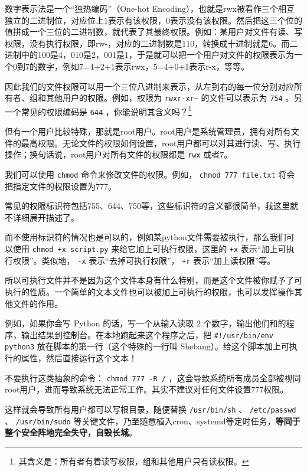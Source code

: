 数字表示法是一个“独热编码”（One-hot Encoding），也就是rwx被看作三个相互独立的二进制位，对应位上1表示有该权限，0表示没有该权限。然后把这三个位的值拼成一个三位的二进制数，就代表了其最终权限。例如：某用户对文件有读、写权限，没有执行权限，即rw-，对应的二进制数是110，转换成十进制就是6。而二进制中的100是4，010是2，001是1，于是就可以把一个用户对文件的权限表示为一个0到7的数字，例如7=4+2+1表示rwx，5=4+0+1表示r-x，等等。

因此我们的文件权限可以用一个三位八进制来表示，从左到右的每一位分别对应所有者、组和其他用户的权限。例如，权限为 \texttt{rwxr-xr--} 的文件可以表示为 \texttt{754} 。另一个常见的权限编码是 \texttt{644} ，你能说明其含义吗？\footnote{其含义是：所有者有着读写权限，组和其他用户只有读权限。}

但有一个用户比较特殊，那就是root用户。root用户是系统管理员，拥有对所有文件的最高权限。无论文件的权限如何设置，root用户都可以对其进行读、写、执行操作；换句话说，root用户对所有文件的权限都是 \texttt{rwx} 或者7。

我们可以使用 \texttt{chmod} 命令来修改文件的权限。例如， \texttt{chmod 777 file.txt} 将会把指定文件的权限设置为777。

常见的权限标识符包括755、644、750等，这些标识符的含义都很简单，我这里就不详细展开描述了。

而不使用标识符的情况也是可以的，例如某python文件需要被执行，那么我们可以使用 \texttt{chmod +x script.py} 来给它加上可执行权限，这里的 \texttt{+x} 表示“加上可执行权限”。类似地， \texttt{-x} 表示“去掉可执行权限”， \texttt{+r} 表示“加上读权限”等。

所以可执行文件并不是因为这个文件本身有什么特别，而是这个文件被你赋予了可执行的性质。一个简单的文本文件也可以被加上可执行的权限，也可以发挥操作其他文件的作用。

例如，如果你会写 Python 的话，写一个从输入读取 2 个数字，输出他们和的程序，输出结果到控制台。在本地跑起来这个程序之后，把  \texttt{\#!/usr/bin/env python3}  放在脚本的第一行（这个特殊的一行叫 Shebang）。给这个脚本加上可执行的属性，然后直接运行这个文本！

\begin{warning}
  不要执行这类抽象的命令： \texttt{chmod 777 -R /} ，这会导致系统所有成员全部被视同root用户，进而导致系统无法正常工作。其实不建议对任何文件设置777权限。
  
  这样就会导致所有用户都可以写根目录，随便替换 \texttt{/usr/bin/sh} 、 \texttt{/etc/passwd} 、 \texttt{/usr/bin/sudo} 等关键文件，乃至随意植入cron、systemd等定时任务，\textbf{等同于整个安全阵地完全失守，自毁长城}。
\end{warning}

